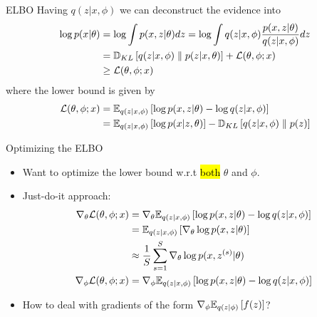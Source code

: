 \documentclass[unicode,11pt]{beamer}
\begin{document}
\begin{frame}{ELBO}
  Having $q(z|x, \phi)$ we can deconstruct the evidence into
  \begin{align*}
    \log p(x|\theta)
    &= \log \int p(x, z|\theta) dz
     = \log \int q(z|x, \phi) \frac{p(x, z|\theta)}{q(z|x, \phi)} dz \\
    &= \mathbb{D}_{KL}\left[ q(z|x, \phi) \parallel p(z|x, \theta) \right] + \mathcal{L}(\theta, \phi; x) \\
    &\ge \mathcal{L}(\theta, \phi; x)
  \end{align*}
  where the lower bound is given by
  \begin{align*}
    \mathcal{L}(\theta, \phi; x)
    &= \E{q(z|x, \phi)}{\log p(x, z|\theta) - \log q(z|x, \phi)} \\
    &= \E{q(z|x, \phi)}{\log p(x|z, \theta)}
     - \KL{q(z|x, \phi)}{p(z)}
  \end{align*}

\end{frame}


\begin{frame}{Optimizing the ELBO}
  \begin{itemize}
  \item Want to optimize the lower bound w.r.t \hl{both} $\theta$ and $\phi$.
  \item Just-do-it approach:
    \begin{align*}
      \grad_\theta \mathcal{L}(\theta, \phi; x)
      &= \grad_\theta \E{q(z|x, \phi)}{\log p(x, z|\theta) - \log q(z|x, \phi)} \\
      &= \E{q(z|x, \phi)}{\grad_\theta \log p(x, z|\theta)} \\
      &\approx \frac{1}{S} \sum\limits_{s = 1}^S
           \grad_\theta \log p(x, z^{(s)}|\theta) \\
      \grad_\phi \mathcal{L}(\theta, \phi; x)
      &= \grad_\phi \E{q(z|x, \phi)}{\log p(x, z|\theta) - \log q(z|x, \phi)}
    \end{align*}
  \item How to deal with gradients of the form $\grad_\phi \E{q(z|\phi)}{f(z)}$?
  \end{itemize}
\end{frame}
\end{document}
